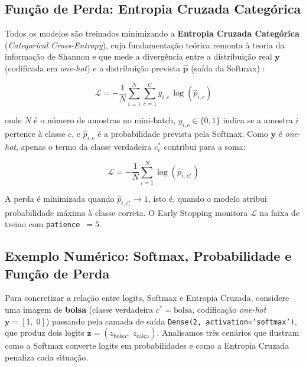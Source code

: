 \documentclass[12pt,a4paper]{article}
\begin{document}
\subsection{Função de Perda: Entropia Cruzada Categórica}

Todos os modelos são treinados minimizando a \textbf{Entropia Cruzada
Categórica} (\emph{Categorical Cross-Entropy}), cuja fundamentação teórica
remonta à teoria da informação de Shannon \cite{shannon1948mathematical} e
que mede a divergência entre a distribuição real $\mathbf{y}$ (codificada
em \emph{one-hot}) e a distribuição prevista $\hat{\mathbf{p}}$ (saída da
Softmax) \cite{goodfellow2016deep}:

\begin{equation}
  \mathcal{L} = -\frac{1}{N}\sum_{i=1}^{N}\sum_{c=1}^{C}
                y_{i,c}\,\log\!\left(\hat{p}_{i,c}\right)
  \label{eq:crossentropy}
\end{equation}

onde $N$ é o número de amostras no mini-batch, $y_{i,c}\in\{0,1\}$ indica se
a amostra $i$ pertence à classe $c$, e $\hat{p}_{i,c}$ é a probabilidade
prevista pela Softmax. Como $\mathbf{y}$ é \emph{one-hot}, apenas o termo
da classe verdadeira $c_i^*$ contribui para a soma:

\begin{equation}
  \mathcal{L} = -\frac{1}{N}\sum_{i=1}^{N}\log\!\left(\hat{p}_{i,\,c_i^*}\right)
  \label{eq:crossentropy_simp}
\end{equation}

A perda é minimizada quando $\hat{p}_{i,c_i^*}\to 1$, isto é, quando o modelo
atribui probabilidade máxima à classe correta. O Early Stopping monitora
$\mathcal{L}$ na faixa de treino com \texttt{patience}~$= 5$.

\subsection{Exemplo Numérico: Softmax, Probabilidade e Função de Perda}
\label{sec:exemplo_numerico}

Para concretizar a relação entre logits, Softmax e Entropia Cruzada, considere uma
imagem de \textbf{bolsa} (classe verdadeira $c^* = \text{bolsa}$, codificação
\emph{one-hot} $\mathbf{y} = [1,\;0]$) passando pela camada de saída
\texttt{Dense(2, activation='softmax')}, que produz dois logits
$\mathbf{z} = (z_{\text{bolsa}},\; z_{\text{calça}})$.
Analisamos três cenários que ilustram como a Softmax converte logits em
probabilidades e como a Entropia Cruzada penaliza cada situação.
\end{document}
